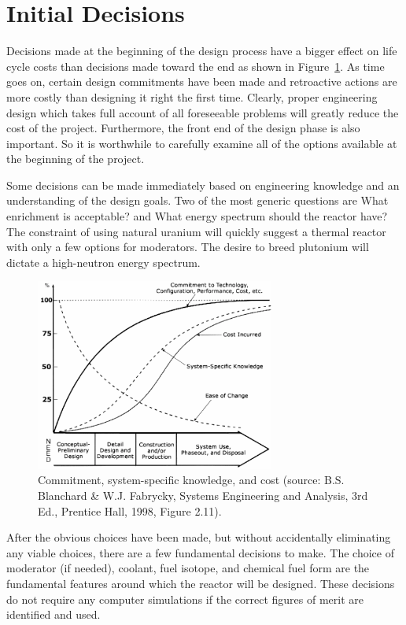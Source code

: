 \section{Initial Decisions}
Decisions made at the beginning of the design process have a bigger effect on life cycle costs than decisions made toward the end as shown in Figure~\ref{fig:life_cycle_cost}. 
As time goes on, certain design commitments have been made and retroactive actions are more costly than designing it right the first time.
Clearly, proper engineering design which takes full account of all foreseeable problems will greatly reduce the cost of the project.
Furthermore, the front end of the design phase is also important. So it is worthwhile to carefully examine all of the options available at the beginning of the project. 

Some decisions can be made immediately based on engineering knowledge and an understanding of the design goals. Two of the most generic questions are What enrichment is acceptable? and What energy spectrum should the reactor have? The constraint of using natural uranium will quickly suggest a thermal reactor with only a few options for moderators. The desire to breed plutonium will dictate a high-neutron energy spectrum. 

\begin{figure}[!hbp]
  \label{fig:life_cycle_cost}
  \centering
  \includegraphics[width=0.70\textwidth]{graphics/life_cycle_cost_chart.png}
  \caption{Commitment, system-specific knowledge, and cost (source: B.S. Blanchard \& W.J. Fabrycky, Systems Engineering and Analysis, 3rd Ed., Prentice Hall, 1998, Figure 2.11).}
\end{figure}

After the obvious choices have been made, but without accidentally eliminating any viable choices, there are a few fundamental decisions to make. The choice of moderator (if needed), coolant, fuel isotope, and chemical fuel form are the fundamental features around which the reactor will be designed. These decisions do not require any computer simulations if the correct figures of merit are identified and used. 


